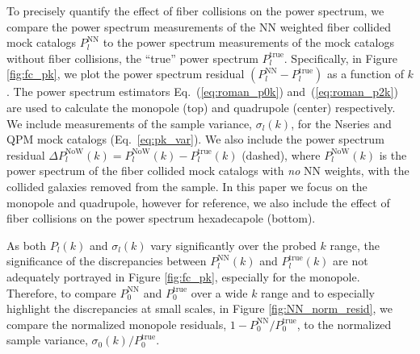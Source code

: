 To precisely quantify the effect of fiber collisions on the power spectrum, 
we compare the power spectrum measurements of the NN weighted fiber collided
mock catalogs $P_l^\mathrm{NN}$ to the power spectrum measurements of 
the mock catalogs without fiber collisions, the ``true'' power spectrum 
$P_l^\mathrm{true}$. Specifically, in Figure \ref{fig:fc_pk}, we 
plot the power spectrum residual $(P_l^\mathrm{NN} - P_l^\mathrm{true})$ as a function of $k$. 
The power spectrum estimators Eq.~(\ref{eq:roman_p0k}) and~(\ref{eq:roman_p2k})  
are used to calculate the monopole (top) and quadrupole (center) respectively. 
We include measurements of the sample 
variance, $\sigma_l(k)$, for the Nseries and QPM mock catalogs (Eq.~\ref{eq:pk_var}). 
We also include the power spectrum residual $\Delta P_l^\mathrm{NoW}(k) = 
P_l^\mathrm{NoW}(k) - P_l^\mathrm{true}(k)$ (dashed), where $P_l^\mathrm{NoW}(k)$ is the 
power spectrum of the fiber collided mock catalogs with {\em no} NN weights,
with the collided galaxies removed from the sample. 
In this paper we focus on the monopole and quadrupole, 
however for reference, we also include the effect of fiber collisions on the power spectrum hexadecapole (bottom).

As both $P_l(k)$ and $\sigma_l(k)$ vary significantly over the probed $k$ range, the significance 
of the discrepancies between $P^\mathrm{NN}_l(k)$ and $P^\mathrm{true}_l(k)$ 
are not adequately portrayed in Figure \ref{fig:fc_pk}, especially for the monopole. 
Therefore, to compare $P_0^\mathrm{NN}$ and $P_0^\mathrm{true}$ over a wide $k$ 
range and to especially highlight the discrepancies at small scales, in 
Figure \ref{fig:NN_norm_resid}, we compare the normalized monopole residuals, 
$1 - P_0^\mathrm{NN}/P_0^\mathrm{true}$, to the normalized sample variance,
$\sigma_0(k)/P_0^\mathrm{true}$. 

